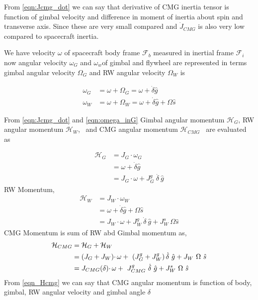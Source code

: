 From \autoref{eqn:Jcmg_dot} we can say that derivative of CMG inertia tensor is function of gimbal velocity and difference in moment of inertia about spin and transverse axis. Since these are very small compared and $\displaystyle \dot{J}_{CMG}$ is also very low compared to spacecraft inertia.

We have velocity $\displaystyle \omega $ of spacecraft body frame $\displaystyle \mathcal{F}_{b}$ measured in inertial frame $\displaystyle \mathcal{F}_{i}$ now angular velocity $\displaystyle \omega _{G}$ and $\displaystyle \omega_{w}$of gimbal and flywheel are represented in terms  gimbal angular velocity $\displaystyle \Omega_{G}$ and RW angular velocity $\displaystyle \Omega _{W}$ is


\begin{equation}
\begin{aligned}
\omega _{G} & =\omega +\Omega _{G} =\omega +\dot{\delta}\hat{g}\\
\omega _{W} & =\omega +\Omega _{W} =\omega +\dot{\delta}\hat{g} +\Omega \hat{s}
\end{aligned}
\label{eqn:omega_inG}
\end{equation}

From \autoref{eqn:Jcmg_dot} and \autoref{eqn:omega_inG} Gimbal angular momentum $\displaystyle\mathcal{H}_{G}$, RW angular momentum $\displaystyle \mathcal{H}_{W}$, \ and CMG angular momentum $\displaystyle \mathcal{H}_{CMG}$ \ are evaluated as


\begin{equation}
\begin{aligned}
\mathcal{H}_{G} & =J_{G} \cdotp \omega _{G}\\
 & =\omega +\dot{\delta}\hat{g}\\
 & =J_{G} \cdotp \omega +J^{g}_{G} \ \dot{\delta \ }\hat{g}
\end{aligned}
\end{equation}
RW Momentum,
\begin{equation}
\begin{aligned}
\mathcal{H}_{W} & =J_{W} \cdotp \omega _{W}\\
 & =\omega +\dot{\delta}\hat{g} +\Omega \hat{s}\\
 & =J_{W} \cdotp \omega +J^{g}_{W} \ \dot{\delta} \ \hat{g} +J^s_{W} \ \Omega \hat{s}
\end{aligned}
\end{equation}
CMG Momentum is sum of RW abd Gimbal momentum as,
\begin{equation}
\begin{aligned}
\mathcal{H}_{CMG} & =\mathcal{H}_{G} +\mathcal{H}_{W}\\
 & =( J_{G} +J_{W}) \cdotp \omega +\ \left( J^{g}_{G} +J^{g}_{W}\right)\dot{\delta} \ \hat{g} +J_{W} \ \Omega \ \hat{s}\\
 & =J_{CMG}( \delta ) \cdotp \omega +\ J^{g}_{CMG} \ \dot{\delta} \ \hat{g} +J^s_{W} \ \Omega \ \hat{s}
\end{aligned}\\
\label{eqn_Hcmg}
\end{equation}
From \autoref{eqn_Hcmg} we can say that CMG angular momentum is function of body, gimbal, RW angular velocity and gimbal angle $\delta$

